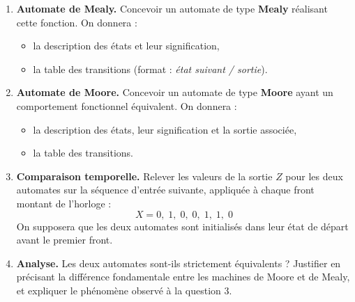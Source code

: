 \documentclass[a4paper,11pt]{article}
\begin{document}
\begin{enumerate}
    \item \textbf{Automate de Mealy.} Concevoir un automate de type \textbf{Mealy} réalisant cette fonction. On donnera :
    \begin{itemize}
        \item la description des états et leur signification,
        \item la table des transitions (format : \textit{état suivant / sortie}).
    \end{itemize}

    \item \textbf{Automate de Moore.} Concevoir un automate de type \textbf{Moore} ayant un comportement fonctionnel équivalent. On donnera :
    \begin{itemize}
        \item la description des états, leur signification et la sortie associée,
        \item la table des transitions.
    \end{itemize}

    \item \textbf{Comparaison temporelle.} Relever les valeurs de la sortie $Z$ pour les deux automates sur la séquence d'entrée suivante, appliquée à chaque front montant de l'horloge :
    \[
        X = 0,\; 1,\; 0,\; 0,\; 1,\; 1,\; 0
    \]
    On supposera que les deux automates sont initialisés dans leur état de départ avant le premier front.

    \item \textbf{Analyse.} Les deux automates sont-ils strictement équivalents ? Justifier en précisant la différence fondamentale entre les machines de Moore et de Mealy, et expliquer le phénomène observé à la question 3.
\end{enumerate}
\end{document}
